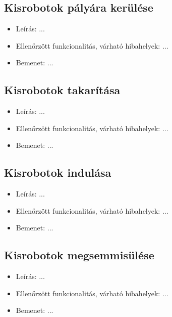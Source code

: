 \subsection{Kisrobotok pályára kerülése}
\begin{itemize}
\item Leírás: \newline
...
\item Ellenőrzött funkcionalitás, várható hibahelyek: \newline
...
\item Bemenet: \newline
... \newline
\end{itemize}

\subsection{Kisrobotok takarítása}
\begin{itemize}
	\item Leírás: \newline
	...
	\item Ellenőrzött funkcionalitás, várható hibahelyek: \newline
	...
	\item Bemenet: \newline
	... \newline
\end{itemize}

\subsection{Kisrobotok indulása}
\begin{itemize}
	\item Leírás: \newline
	...
	\item Ellenőrzött funkcionalitás, várható hibahelyek: \newline
	...
	\item Bemenet: \newline
	... \newline
\end{itemize}

\subsection{Kisrobotok megsemmisülése}
\begin{itemize}
	\item Leírás: \newline
	...
	\item Ellenőrzött funkcionalitás, várható hibahelyek: \newline
	...
	\item Bemenet: \newline
	... \newline
\end{itemize}

